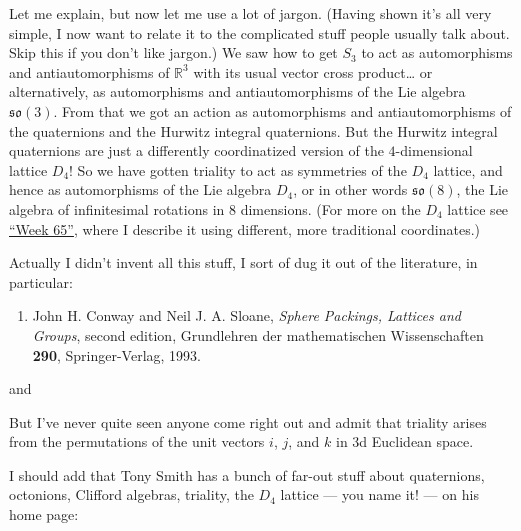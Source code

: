 \documentclass{article}
\def\tightlist{}
\renewcommand{\texttt}[1]{%
  \begingroup
  \ttfamily
  \begingroup\lccode`~=`/\lowercase{\endgroup\def~}{/\discretionary{}{}{}}%
  \begingroup\lccode`~=`[\lowercase{\endgroup\def~}{[\discretionary{}{}{}}%
  \begingroup\lccode`~=`.\lowercase{\endgroup\def~}{.\discretionary{}{}{}}%
  \catcode`/=\active\catcode`[=\active\catcode`.=\active
  \scantokens{#1\noexpand}%
  \endgroup
}
\begin{document}
Let me explain, but now let me use a lot of jargon. (Having shown it's
all very simple, I now want to relate it to the complicated stuff people
usually talk about. Skip this if you don't like jargon.) We saw how to
get \(S_3\) to act as automorphisms and antiautomorphisms of
\(\mathbb{R}^3\) with its usual vector cross product\ldots{} or
alternatively, as automorphisms and antiautomorphisms of the Lie algebra
\(\mathfrak{so}(3)\). From that we got an action as automorphisms and
antiautomorphisms of the quaternions and the Hurwitz integral
quaternions. But the Hurwitz integral quaternions are just a differently
coordinatized version of the \(4\)-dimensional lattice \(D_4\)! So we
have gotten triality to act as symmetries of the \(D_4\) lattice, and
hence as automorphisms of the Lie algebra \(D_4\), or in other words
\(\mathfrak{so}(8)\), the Lie algebra of infinitesimal rotations in 8
dimensions. (For more on the \(D_4\) lattice see
\protect\hyperlink{week65}{``Week 65''}, where I describe it using
different, more traditional coordinates.)

Actually I didn't invent all this stuff, I sort of dug it out of the
literature, in particular:

\begin{enumerate}
\def\labelenumi{\arabic{enumi})}
\tightlist
\item
  John H. Conway and Neil J. A. Sloane, \emph{Sphere Packings, Lattices
  and Groups}, second edition, Grundlehren der mathematischen
  Wissenschaften \textbf{290}, Springer-Verlag, 1993.
\end{enumerate}

and


But I've never quite seen anyone come right out and admit that triality
arises from the permutations of the unit vectors \(i\), \(j\), and \(k\)
in 3d Euclidean space.

I should add that Tony Smith has a bunch of far-out stuff about
quaternions, octonions, Clifford algebras, triality, the \(D_4\) lattice
--- you name it! --- on his home page:
\end{document}
